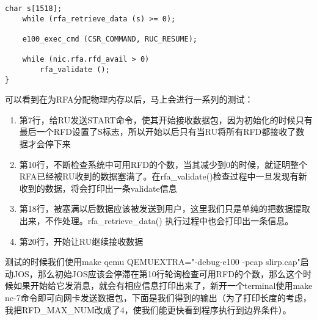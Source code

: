 \documentclass{article}
\newcommand{\funcname}[1]{{\ttfamily \small #1}}
\begin{document}
\begin{CJK*}{UTF8}{gkai}
\begin{lstlisting}[style=ccode, title={\scriptsize \ttfamily \bfseries kern/e100.c: rfa\_init()}]
    char s[1518];
    while (rfa_retrieve_data (s) >= 0);

    e100_exec_cmd (CSR_COMMAND, RUC_RESUME);

    while (nic.rfa.rfd_avail > 0)
        rfa_validate ();
}
\end{lstlisting}

可以看到在为RFA分配物理内存以后，马上会进行一系列的测试：

\begin{enumerate}
\item{第7行，给RU发送START命令，使其开始接收数据包，因为初始化的时候只有最后一个RFD设置了S标志，所以开始以后只有当RU将所有RFD都接收了数据才会停下来}
\item{第10行，不断检查系统中可用RFD的个数，当其减少到0的时候，就证明整个RFA已经被RU收到的数据塞满了。在\funcname{rfa\_validate()}检查过程中一旦发现有新收到的数据，将会打印出一条validate信息}
\item{第18行，被塞满以后数据应该被发送到用户，这里我们只是单纯的把数据提取出来，不作处理。\funcname{rfa\_retrieve\_data()} 执行过程中也会打印出一条信息。
}
\item{第20行，开始让RU继续接收数据}
\end{enumerate}

测试的时候我们使用make qemu QEMUEXTRA="-debug-e100 -pcap slirp.cap"启动JOS，那么初始JOS应该会停滞在第10行轮询检查可用RFD的个数，那么这个时候如果开始给它发消息，就会有相应信息打印出来了，新开一个terminal使用make nc-7命令即可向网卡发送数据包，下面是我们得到的输出（为了打印长度的考虑，我把RFD\_MAX\_NUM改成了4，使我们能更快看到程序执行到边界条件）。



\end{CJK*}
\end{document}

